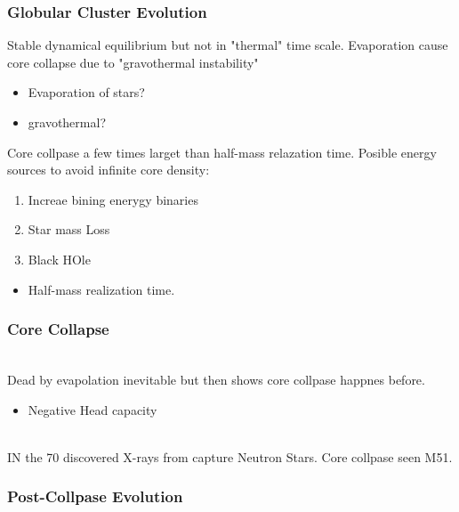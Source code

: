 \documentclass{article}
\newcounter{para}[subsubsection]
\newcommand{\para}{
\addtocounter{para}{1}
\vspace{.3cm}
\arabic{para}
\vspace{.3cm}\\
}
\begin{document}
\subsubsection{Globular Cluster Evolution}

\vspace{.3cm}
\addtocounter{para}{1}
\vspace{.3cm}

Stable dynamical equilibrium but not in "thermal" time scale. Evaporation cause core collapse due to "gravothermal instability"



\begin{itemize}
    \item Evaporation of stars?
    \item gravothermal?
\end{itemize}


\vspace{.3cm}
\addtocounter{para}{1}
\vspace{.3cm}

Core collpase a few times larget than half-mass relazation time. Posible energy sources to avoid infinite core density:

\begin{enumerate}
    \item Increae bining enerygy binaries
    \item Star mass Loss
    \item Black HOle
\end{enumerate}
\begin{itemize}
    \item Half-mass realization time.
\end{itemize}



\subsubsection{Core Collapse}

\para
Dead by evapolation inevitable but  then shows core collpase happnes before. 

\begin{itemize}
    \item Negative Head capacity
\end{itemize}

\para
IN the 70 discovered X-rays from capture Neutron Stars. Core collpase seen M51. 

\subsubsection{Post-Collpase Evolution}
\end{document}

